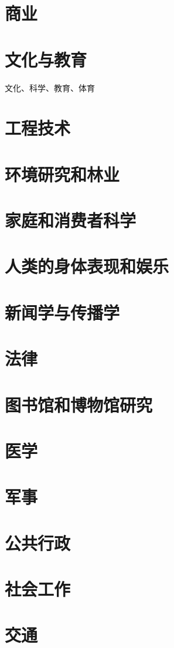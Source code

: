 \chapter{商业}

\chapter{文化与教育}

文化、科学、教育、体育

\chapter{工程技术}

\chapter{环境研究和林业}

\chapter{家庭和消费者科学}

\chapter{人类的身体表现和娱乐}


\chapter{新闻学与传播学}

\chapter{法律}

\chapter{图书馆和博物馆研究}




\chapter{医学}

\chapter{军事}

\chapter{公共行政}

\chapter{社会工作}

\chapter{交通}

